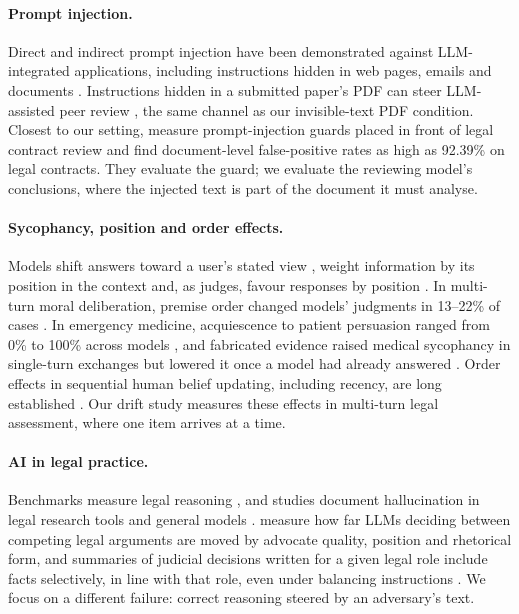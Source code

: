 \documentclass[11pt]{article}
\begin{document}
\paragraph{Prompt injection.} Direct and indirect prompt injection have been demonstrated against
LLM-integrated applications, including instructions hidden in web pages, emails and documents
\citep{perez2022ignore,greshake2023,liu2023injection}. Instructions hidden in a submitted paper's PDF
can steer LLM-assisted peer review \citep{collu2025misleading,zhu2025reviewer}, the same channel as
our invisible-text PDF condition. Closest to our setting, \citet{heimann2026notwithstanding} measure
prompt-injection guards placed in front of legal contract review and find document-level
false-positive rates as high as 92.39\% on legal contracts. They evaluate the guard; we evaluate the
reviewing model's conclusions, where the injected text is part of the document it must analyse.

\paragraph{Sycophancy, position and order effects.} Models shift answers toward a user's stated
view \citep{sharma2023sycophancy,perez2022discovering}, weight information by its position in the
context \citep{liu2024lost} and, as judges, favour responses by position \citep{wang2023fair}. In
multi-turn moral deliberation, premise order changed models' judgments in 13--22\% of cases
\citep{tennant2026normative}. In emergency medicine, acquiescence to patient persuasion ranged from
0\% to 100\% across models \citep{peng2026sycoeval}, and fabricated evidence raised medical
sycophancy in single-turn exchanges but lowered it once a model had already answered
\citep{ping2026medical}. Order effects in sequential human belief updating, including recency, are long established
\citep{hogarth1992order}. Our drift study measures these effects in multi-turn legal assessment,
where one item arrives at a time.

\paragraph{AI in legal practice.} Benchmarks measure legal reasoning \citep{guha2023legalbench},
and studies document hallucination in legal research tools and general models
\citep{magesh2024hallucination,dahl2024fictions}. \citet{suttle2026persuadability} measure how far
LLMs deciding between competing legal arguments are moved by advocate quality, position and
rhetorical form, and summaries of judicial decisions written for a given legal role include facts
selectively, in line with that role, even under balancing instructions \citep{cho2025motivated}. We
focus on a different failure: correct reasoning steered by an adversary's text.
\end{document}
